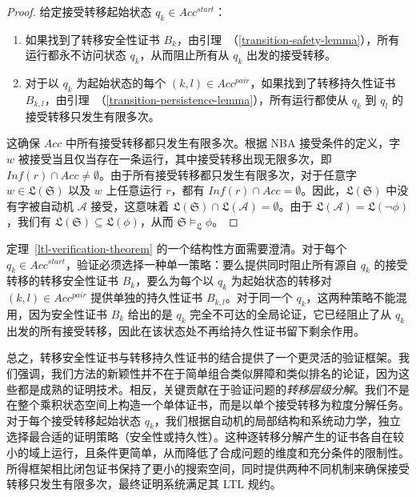 \begin{proof}
  给定接受转移起始状态 $q_k \in Acc^{start}$：
  \begin{enumerate}
    \item 如果找到了转移安全性证书 $B_k$，由引理~（\ref{transition-safety-lemma}），所有运行都永不访问状态 $q_k$，从而阻止所有从 $q_k$ 出发的接受转移。
    \item 对于以 $q_k$ 为起始状态的每个 $(k, l) \in Acc^{pair}$，如果找到了转移持久性证书 $B_{k,l}$，由引理~（\ref{transition-persistence-lemma}），所有运行都使从 $q_k$ 到 $q_l$ 的接受转移只发生有限多次。
  \end{enumerate}
  这确保 $Acc$ 中所有接受转移都只发生有限多次。根据 NBA 接受条件的定义，字 $w$ 被接受当且仅当存在一条运行，其中接受转移出现无限多次，即 $\mathit{Inf}(r) \cap Acc \neq \emptyset$。由于所有接受转移都只发生有限多次，对于任意字 $w \in \mathfrak{L}(\mathfrak{S})$ 以及 $w$ 上任意运行 $r$，都有 $\mathit{Inf}(r) \cap Acc = \emptyset$。因此，$\mathfrak{L}(\mathfrak{S})$ 中没有字被自动机 $\mathcal{A}$ 接受，这意味着 $\mathfrak{L}(\mathfrak{S}) \cap \mathfrak{L}(\mathcal{A}) = \emptyset$。由于 $\mathfrak{L}(\mathcal{A}) = \mathfrak{L}(\neg \phi)$，我们有 $\mathfrak{L}(\mathfrak{S}) \subseteq \mathfrak{L}(\phi)$，从而 $\mathfrak{S} \models_{\mathfrak{L}} \phi$。
\end{proof}

定理~\ref{ltl-verification-theorem} 的一个结构性方面需要澄清。对于每个 $q_k \in Acc^{start}$，验证必须选择一种单一策略：要么提供同时阻止所有源自 $q_k$ 的接受转移的转移安全性证书 $B_k$，要么为每个以 $q_k$ 为起始状态的转移对 $(k, l) \in Acc^{pair}$ 提供单独的持久性证书 $B_{k,l}$。对于同一个 $q_k$，这两种策略不能混用，因为安全性证书 $B_k$ 给出的是 $q_k$ 完全不可达的全局论证，它已经阻止了从 $q_k$ 出发的所有接受转移，因此在该状态处不再给持久性证书留下剩余作用。

总之，转移安全性证书与转移持久性证书的结合提供了一个更灵活的验证框架。我们强调，我们方法的新颖性并不在于简单组合类似屏障和类似排名的论证，因为这些都是成熟的证明技术。相反，关键贡献在于验证问题的\emph{转移层级分解}。我们不是在整个乘积状态空间上构造一个单体证书，而是以单个接受转移为粒度分解任务。对于每个接受转移起始状态 $q_k$，我们根据自动机的局部结构和系统动力学，独立选择最合适的证明策略（安全性或持久性）。这种逐转移分解产生的证书各自在较小的域上运行，且条件更简单，从而降低了合成问题的维度和充分条件的限制性。所得框架相比闭包证书保持了更小的搜索空间，同时提供两种不同机制来确保接受转移只发生有限多次，最终证明系统满足其 LTL 规约。

